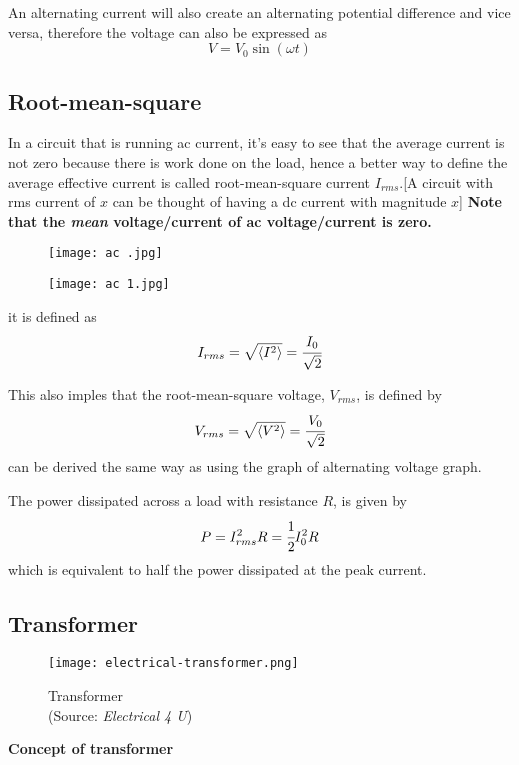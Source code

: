 \documentclass{article}
\begin{document}
An alternating current will also create an alternating potential difference and vice versa, therefore the voltage can also be expressed as
$$V=V_0\sin(\omega t)$$


 \subsection{Root-mean-square}


In a circuit that is running ac current, it's easy to see that the average current is not zero because there is work done on the load, hence a better way to define the average effective current is called root-mean-square current $I_{rms}$.[A circuit with rms current of $x$ can be thought of having a dc current with magnitude $x$] \textbf{Note that the \textit{mean} voltage/current of ac voltage/current is zero.}

\begin{figure}[H]
    \centering
    \texttt{[image: ac .jpg]}
\end{figure}
\begin{figure}[H]
    \centering
    \texttt{[image: ac 1.jpg]}
\end{figure}

it is defined as 
$$I_{rms}=\sqrt{\langle I^2\rangle}=\cfrac{I_0}{\sqrt{2}}$$

This also imples that the root-mean-square voltage, $V_{rms}$, is defined by 
$$V_{rms}=\sqrt{\langle V^2\rangle}=\cfrac{V_0}{\sqrt{2}}$$
can be derived the same way as using the graph of alternating voltage graph.

The power dissipated across a load with resistance $R$, is given by 
$$P=I_{rms}^2R=\cfrac{1}{2}I_0^2R$$
which is equivalent to half the power dissipated at the peak current. 


 \subsection{Transformer}


\begin{figure}[H]
    \centering
    \captionsetup{justification=centering,margin=2cm}
    \texttt{[image: electrical-transformer.png]}
    \caption*{Transformer \\ (Source: \textit{Electrical 4 U})}
\end{figure}

\begin{flushleft}
\textbf{Concept of transformer}
\end{flushleft}
\end{document}
